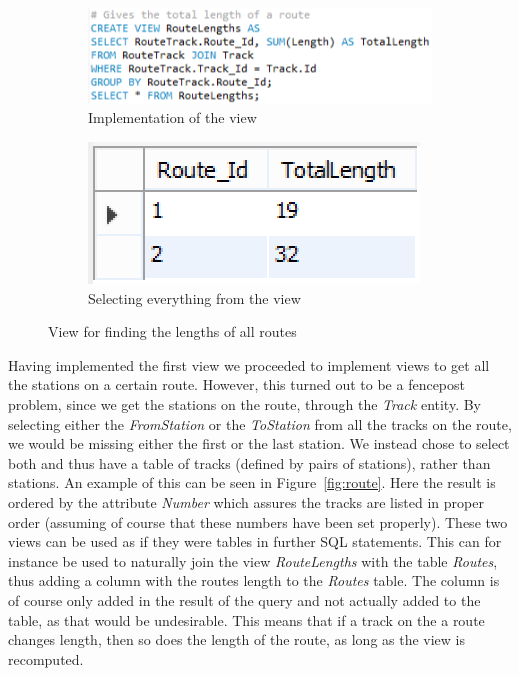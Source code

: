 \begin{figure}[h]
    \centering
    \begin{subfigure}[b]{0.45 \textwidth}
        \centering
        \includegraphics[width=\textwidth]{img/RouteLengths}
        \caption{Implementation of the view}
    \end{subfigure}
    \begin{subfigure}[b]{0.45 \textwidth}
        \centering
        \includegraphics{img/RouteLengthsView}
        \caption{Selecting everything from the view}
    \end{subfigure}
    \caption{View for finding the lengths of all routes}
    \label{fig:length}
\end{figure}

Having implemented the first view we proceeded to implement views to get all 
the stations on a certain route. However, this turned out to be a fencepost 
problem, since we get the stations on the route, through the \emph{Track} 
entity. By selecting either the \emph{FromStation} or the \emph{ToStation} from 
all the tracks on the route, we would be missing either the first or the last 
station. We instead chose to select both and thus have a table of tracks 
(defined by pairs of stations), rather than stations. An example of this can be 
seen in Figure~\ref{fig:route}. Here the result is ordered by the attribute 
\emph{Number} which assures the tracks are listed in proper order (assuming of 
course that these numbers have been set properly). These two views can be used 
as if they were tables in further SQL statements. This can for instance be used 
to naturally join the view \emph{RouteLengths} with the table \emph{Routes}, 
thus adding a column with the routes length to the \emph{Routes} table. The 
column is of course only added in the result of the query and not actually 
added to the table, as that would be undesirable. This means that if a track on 
the a route changes length, then so does the length of the route, as long as 
the view is recomputed.


